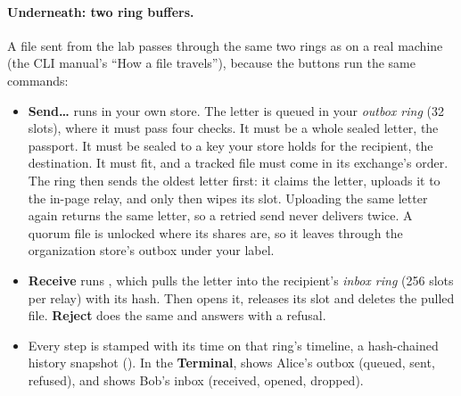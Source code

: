 \paragraph{Underneath: two ring buffers.} A file sent from the lab passes
through the same two rings as on a real machine (the CLI manual's ``How a file
travels''), because the buttons run the same commands:
\begin{itemize}
  \item \textbf{Send\ldots} runs  in your own store. The
  letter is queued in your \emph{outbox ring} (32 slots), where it must pass
  four checks. It must be a whole sealed letter, the passport. It must be
  sealed to a key your store holds for the recipient, the destination. It must
  fit, and a tracked file must come in its exchange's order. The ring then
  sends the oldest letter first: it claims the letter, uploads it to the
  in-page relay, and only then wipes its slot. Uploading the same letter again
  returns the same letter, so a retried send never delivers twice. A quorum file is unlocked where
  its shares are, so it leaves through the organization store's outbox under
  your label.
  \item \textbf{Receive} runs , which pulls the letter
  into the recipient's \emph{inbox ring} (256 slots per relay) with its hash.
  Then  opens it, releases its slot and deletes the pulled
  file. \textbf{Reject} does the same and answers with a refusal.
  \item Every step is stamped with its time on that ring's timeline, a
  hash-chained history snapshot (). In the \textbf{Terminal},
   shows
  Alice's outbox (queued, sent, refused), and
   shows Bob's
  inbox (received, opened, dropped).
\end{itemize}





